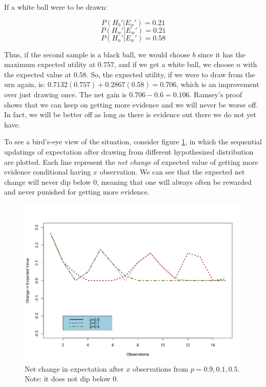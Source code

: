 If a white ball were to be drawn:

\[P(H_b'|E_w') = 0.21\] \[P(H_w'|E_w') = 0.21\] \[P(H_n'|E_w') = 0.58\]

Thus, if the second sample is a black ball, we would choose \(b\) since
it has the maximum expected utility at \(0.757\), and if we get a white
ball, we choose \(n\) with the expected value at \(0.58\). So, the
expected utility, if we were to draw from the urn again, is:
\(0.7132(0.757) + 0.2867(0.58) = 0.706\), which is an improvement over
just drawing once. The net gain is \(0.706 - 0.6 = 0.106\). Ramsey's
proof shows that we can keep on getting more evidence and we will never
be worse off. In fact, we will be better off as long as there is
evidence out there we do not yet have.

To see a bird's-eye view of the situation, consider figure \ref{fig:expectedchange}, in which the sequential updatings of expectation after drawing from different hypothesized distribution are plotted. Each line represent the \emph{net change} of expected value of getting more evidence conditional having $x$ observation. We can see that the expected net change will never dip below $0$, meaning that one will always often be rewarded and never punished for getting more evidence.

\begin{figure}[h] 
\begin{center}
\includegraphics[scale=0.5]{Expectedchange.png}
	\caption{Net change in expectation after $x$ observations from $p=0.9,0.1,0.5$. Note: it does not dip below 0.}
	\label{fig:expectedchange}
\end{center}	
\end{figure}


